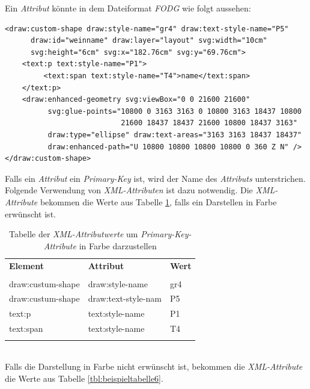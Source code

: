 \noindent
Ein \textit{Attribut} könnte in dem Dateiformat \textit{FODG} wie folgt aussehen:
\begin{verbatim}
<draw:custom-shape draw:style-name="gr4" draw:text-style-name="P5" 
      draw:id="weinname" draw:layer="layout" svg:width="10cm" 
      svg:height="6cm" svg:x="182.76cm" svg:y="69.76cm">
    <text:p text:style-name="P1">
         <text:span text:style-name="T4">name</text:span>
    </text:p>
    <draw:enhanced-geometry svg:viewBox="0 0 21600 21600" 
          svg:glue-points="10800 0 3163 3163 0 10800 3163 18437 10800 
                           21600 18437 18437 21600 10800 18437 3163"
          draw:type="ellipse" draw:text-areas="3163 3163 18437 18437" 
          draw:enhanced-path="U 10800 10800 10800 10800 0 360 Z N" />
</draw:custom-shape>
\end{verbatim}

\hon{}
\noindent
Falls ein \textit{Attribut} ein \textit{Primary-Key} ist, wird der Name des \textit{Attributs} unterstrichen. Folgende Verwendung von \textit{XML-Attributen} ist dazu notwendig. 
Die \textit{XML-Attribute} bekommen die Werte aus Tabelle \ref{tbl:beispieltabelle5}, falls ein Darstellen in Farbe erwünscht ist.


\begin{table}[H]
	\centering
	\begin{tabular}{lll}
		\textbf{Element} & \textbf{Attribut}  & \textbf{Wert} \\
		\\
		draw:custum-shape & draw:style-name           & gr4             \\
		draw:custum-shape & draw:text-style-nam      & P5             \\
		text:p & text:style-name       & P1             \\
		text:span & text:style-name       & T4            \\
		\\
	\end{tabular}
	
	\caption{Tabelle der \textit{XML-Attributwerte} um \textit{Primary-Key-Attribute} in Farbe darzustellen}
	\label{tbl:beispieltabelle5}
	
\end{table}
\noindent
\hon{}
\\
\noindent
Falls die Darstellung in Farbe nicht erwünscht ist, bekommen die \textit{XML-Attribute} die Werte aus Tabelle \ref{tbl:beispieltabelle6}.

